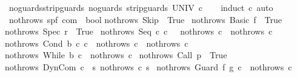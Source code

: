 \begin{isabellebody}
\isanewline
{}\isamarkupfalse%
\ noguards{\isacharunderscore}strip{\isacharunderscore}guards{\isacharcolon}\ {\isachardoublequoteopen}noguards\ {\isacharparenleft}strip{\isacharunderscore}guards\ UNIV\ c{\isacharparenright}{\isachardoublequoteclose}\isanewline
%
\isadelimproof
\ \ %
\endisadelimproof
%
\isatagproof
{}\isamarkupfalse%
\ {\isacharparenleft}induct\ c{\isacharparenright}\ auto%
\endisatagproof
{\isafoldproof}%
%
\isadelimproof
\isanewline
%
\endisadelimproof
\isanewline
{}\isamarkupfalse%
\ nothrows{\isacharcolon}{\isacharcolon}\ {\isachardoublequoteopen}{\isacharparenleft}{\isacharprime}s{\isacharcomma}{\isacharprime}p{\isacharcomma}{\isacharprime}f{\isacharparenright}\ com\ {\isasymRightarrow}\ bool{\isachardoublequoteclose}\isanewline
{}\isanewline
{\isachardoublequoteopen}nothrows\ Skip\ {\isacharequal}\ True{\isachardoublequoteclose}\ {\isacharbar}\isanewline
{\isachardoublequoteopen}nothrows\ {\isacharparenleft}Basic\ f{\isacharparenright}\ {\isacharequal}\ True{\isachardoublequoteclose}\ {\isacharbar}\isanewline
{\isachardoublequoteopen}nothrows\ {\isacharparenleft}Spec\ r{\isacharparenright}\ {\isacharequal}\ True{\isachardoublequoteclose}\ {\isacharbar}\isanewline
{\isachardoublequoteopen}nothrows\ {\isacharparenleft}Seq\ c\ c\ \ {\isacharequal}\ {\isacharparenleft}nothrows\ c\ {\isasymand}\ nothrows\ c\ {\isacharbar}\isanewline
{\isachardoublequoteopen}nothrows\ {\isacharparenleft}Cond\ b\ c\ c\ {\isacharequal}\ {\isacharparenleft}nothrows\ c\ {\isasymand}\ nothrows\ c\ {\isacharbar}\isanewline
{\isachardoublequoteopen}nothrows\ {\isacharparenleft}While\ b\ c{\isacharparenright}\ {\isacharequal}\ nothrows\ c{\isachardoublequoteclose}\ {\isacharbar}\isanewline
{\isachardoublequoteopen}nothrows\ {\isacharparenleft}Call\ p{\isacharparenright}\ {\isacharequal}\ True{\isachardoublequoteclose}\ {\isacharbar}\isanewline
{\isachardoublequoteopen}nothrows\ {\isacharparenleft}DynCom\ c{\isacharparenright}\ {\isacharequal}\ {\isacharparenleft}{\isasymforall}s{\isachardot}\ nothrows\ {\isacharparenleft}c\ s{\isacharparenright}{\isacharparenright}{\isachardoublequoteclose}\ {\isacharbar}\isanewline
{\isachardoublequoteopen}nothrows\ {\isacharparenleft}Guard\ f\ g\ c{\isacharparenright}\ {\isacharequal}\ nothrows\ c{\isachardoublequoteclose}\ {\isacharbar}\isanewline

\end{isabellebody}
